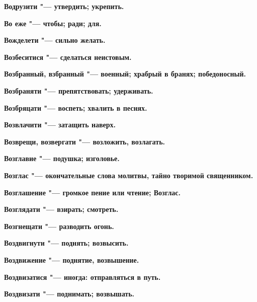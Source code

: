 \bfseries Водрузити \normalfont{} "--- утвердить; укрепить. 




\bfseries Во еже \normalfont{} "--- чтобы; ради; для. 




\bfseries Вожделети \normalfont{} "--- сильно желать. 




\bfseries Возбеситися \normalfont{} "--- сделаться неистовым. 




\bfseries Возбранный, взбранный \normalfont{} "--- военный; храбрый в бранях; победоносный. 




\bfseries Возбраняти \normalfont{} "--- препятствовать; удерживать. 




\bfseries Возбряцати \normalfont{} "--- воспеть; хвалить в песнях. 




\bfseries Возвлачити \normalfont{} "--- затащить наверх. 




\bfseries Возврещи, возвергати \normalfont{} "--- возложить, возлагать. 




\bfseries Возглавие \normalfont{} "--- подушка; изголовье. 




\bfseries Возглас \normalfont{} "--- окончательные слова молитвы, тайно творимой священником. 




\bfseries Возглашение \normalfont{} "--- громкое пение или чтение; Возглас. 




\bfseries Возглядати \normalfont{} "--- взирать; смотреть. 




\bfseries Возгнещати \normalfont{} "--- разводить огонь. 




\bfseries Воздвигнути \normalfont{} "--- поднять; возвысить. 




\bfseries Воздвижение \normalfont{} "--- поднятие, возвышение. 




\bfseries Воздвизатися \normalfont{} "--- иногда: отправляться в путь. 




\bfseries Воздвизати \normalfont{} "--- поднимать; возвышать. 




